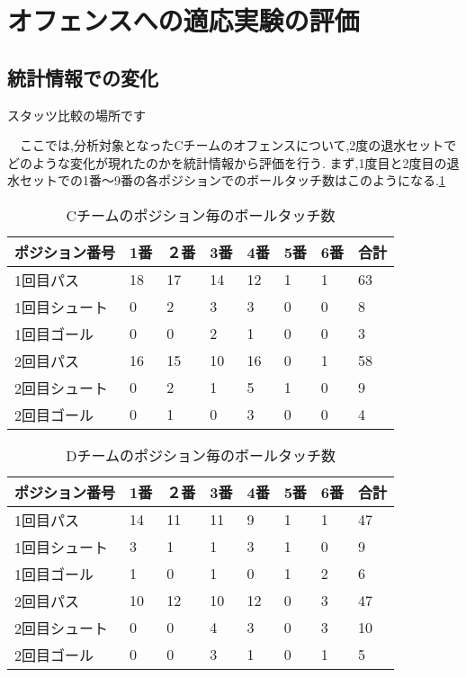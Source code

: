\documentclass[../main.tex]{subfiles}
\begin{document}
\section{オフェンスへの適応実験の評価}

\subsection{統計情報での変化}
スタッツ比較の場所です
\par　ここでは,分析対象となったCチームのオフェンスについて,2度の退水セットでどのような変化が現れたのかを統計情報から評価を行う.
まず,1度目と2度目の退水セットでの1番〜9番の各ポジションでのボールタッチ数はこのようになる.\ref{table:Cチームのポジション毎のボールタッチ数}\\



\begin{table}[h]
  \caption{Cチームのポジション毎のボールタッチ数}\label{table:Cチームのポジション毎のボールタッチ数}
  \begin{tabular}{llllllll}
    \hline\hline
    ポジション番号 & 1番 & ２番 & 3番 & 4番 & 5番 & 6番 & 合計 \\
  \hline\hline
  1回目パス      & 18 & 17 & 14 & 12 & 1  & 1  &  63 \\
  1回目シュート     & 0 & 2 & 3 & 3  & 0  & 0  &  8 \\
  1回目ゴール     & 0 & 0 & 2 & 1  & 0  & 0  &  3 \\
  \hline
  2回目パス      & 16 & 15 & 10 & 16  & 0  & 1  &  58 \\
  2回目シュート     & 0 & 2 & 1 & 5  & 1  & 0  &  9 \\
  2回目ゴール     & 0 & 1 & 0 & 3  & 0  &  0 &  4 \\
  \hline
  \end{tabular}
  \end{table}




  \begin{table}[h]
    \caption{Dチームのポジション毎のボールタッチ数}\label{table:Dチームのポジション毎のボールタッチ数}
    \begin{tabular}{llllllll}
      \hline\hline
      ポジション番号 & 1番 & ２番 & 3番 & 4番 & 5番 & 6番 & 合計 \\
    \hline\hline
    1回目パス      & 14 & 11 & 11 & 9 & 1  & 1  &  47 \\
    1回目シュート     & 3 & 1 & 1 & 3  & 1  & 0  &  9 \\
    1回目ゴール     & 1 & 0 & 1 & 0  & 1  & 2  &  6 \\
    \hline
    2回目パス      & 10 & 12 & 10 & 12  & 0  & 3  &  47 \\
    2回目シュート     & 0 & 0 & 4 & 3  & 0  & 3  &  10 \\
    2回目ゴール     & 0 & 0 & 3 & 1  & 0  &  1 &  5 \\
    \hline
    \end{tabular}
    \end{table}
\end{document}
